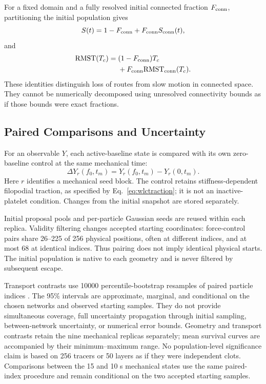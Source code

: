 For a fixed domain and a fully resolved initial connected fraction $F_{\rm conn}$, partitioning the initial population gives
\begin{equation}
S(t)=1-F_{\rm conn}+F_{\rm conn}S_{\rm conn}(t),
\label{eq:survival-connectivity}
\end{equation}
and
\begin{equation}
\begin{aligned}
\mathrm{RMST}(T_c)={}&(1-F_{\rm conn})T_c\\
&+F_{\rm conn}\mathrm{RMST}_{\rm conn}(T_c).
\end{aligned}
\label{eq:rmst-connectivity}
\end{equation}
These identities distinguish loss of routes from slow motion in connected space. They cannot be numerically decomposed using unresolved connectivity bounds as if those bounds were exact fractions.

\subsection{Paired Comparisons and Uncertainty}
\label{sec:comparison-framework}
For an observable $Y$, each active-baseline state is compared with its own zero-baseline control at the same mechanical time:
\begin{equation}
\Delta Y_r(f_0,t_m)=Y_r(f_0,t_m)-Y_r(0,t_m).
\label{eq:paired-change}
\end{equation}
Here $r$ identifies a mechanical seed block. The control retains stiffness-dependent filopodial traction, as specified by Eq.~\eqref{eq:wlctraction}; it is not an inactive-platelet condition. Changes from the initial snapshot are stored separately.

Initial proposal pools and per-particle Gaussian seeds are reused within each replica. Validity filtering changes accepted starting coordinates: force-control pairs share 26--225 of 256 physical positions, often at different indices, and at most 68 at identical indices. Thus pairing does not imply identical physical starts. The initial population is native to each geometry and is never filtered by subsequent escape.

Transport contrasts use 10000 percentile-bootstrap resamples of paired particle indices \cite{Efron1979}. The 95\% intervals are approximate, marginal, and conditional on the chosen networks and observed starting samples. They do not provide simultaneous coverage, full uncertainty propagation through initial sampling, between-network uncertainty, or numerical error bounds. Geometry and transport contrasts retain the nine mechanical replicas separately; mean survival curves are accompanied by their minimum--maximum range. No population-level significance claim is based on 256 tracers or 50 layers as if they were independent clots. Comparisons between the 15 and 10 s mechanical states use the same paired-index procedure and remain conditional on the two accepted starting samples.

